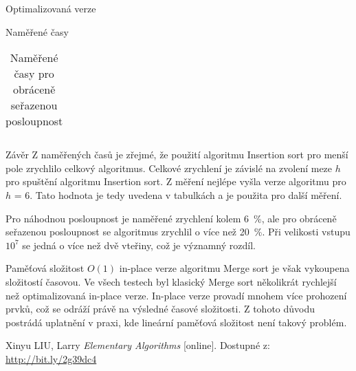 \documentclass[a4paper,11pt]{article}
\begin{document}
\begin{section}{Optimalizovaná verze}
\begin{subsection}{Naměřené časy}
\begin{table}[h]
\begin{tabular}{|l|c|c|c|c|}
\end{tabular}
\caption{Naměřené časy pro obráceně seřazenou posloupnost}
\label{table:six}
\end{table}
\end{subsection}

\begin{subsection}{Závěr}
Z naměřených časů je zřejmé, že použití algoritmu Insertion sort pro menší pole zrychlilo
celkový algoritmus. Celkové zrychlení je závislé na zvolení meze $h$ pro spuštění
algoritmu Insertion sort. Z měření nejlépe vyšla verze algoritmu pro $h$ = 6. Tato hodnota je tedy
uvedena v tabulkách a je použita pro další měření.

Pro náhodnou posloupnost je naměřené zrychlení kolem 6~\%, ale pro obráceně seřazenou posloupnost
se algoritmus zrychlil o více než 20~\%. Při velikosti vstupu $10^7$ se jedná o více než dvě vteřiny,
což je významný rozdíl.

Paměťová složitost $O(1)$ in-place verze algoritmu Merge sort je však vykoupena složitostí časovou.
Ve všech testech byl klasický Merge sort několikrát rychlejší než optimalizovaná in-place verze.
In-place verze provadí mnohem více prohození prvků, což se odráží právě na výsledné časové složitosti.
Z tohoto důvodu postrádá uplatnění v praxi, kde lineární paměťová složitost není takový problém.

\end{subsection}
\newpage
\begin{thebibliography}{}

Xinyu LIU, Larry \emph{Elementary Algorithms} [online].  Dostupné z: \url{http://bit.ly/2g39dc4}

\end{thebibliography}

\end{section}
\end{document}
